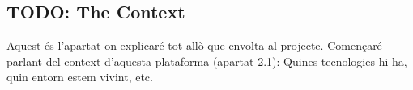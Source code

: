 
\subsection{TODO: The Context}

Aquest és l'apartat on explicaré tot allò que envolta al projecte. Començaré
parlant del context d'aquesta plataforma (apartat 2.1): Quines tecnologies hi
ha, quin entorn estem vivint, etc.
